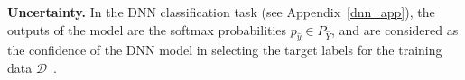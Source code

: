 
 


\noindent
\textbf{Uncertainty.}
In the DNN classification task (see Appendix~\ref{dnn_app}), the outputs of the model are the softmax probabilities $p_{\hat{y}} \in P_{\hat{Y}}$, and are considered as the confidence of the DNN model in selecting the target labels for the training data $\mathcal{D}$~\cite{deeplearning,confidence}. 

